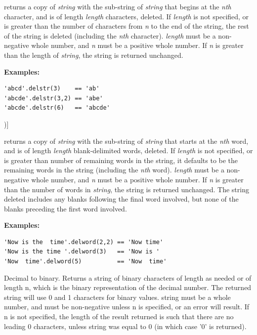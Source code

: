\begin{description}
returns a copy of \emph{string} with the sub-string of
\emph{string} that begins at the \emph{n}\emph{th} character, and is
of length \emph{length} characters, deleted.
If \emph{length} is not specified, or is greater than the number of
characters from \emph{n} to the end of the string, the rest of the
string is deleted (including the \emph{n}\emph{th} character).
\emph{length} must be a non-negative whole number, and \emph{n}
must be a positive whole number.  If \emph{n} is greater than the
length of \emph{string}, the string is returned unchanged.
 
\textbf{Examples:}
\begin{lstlisting}
'abcd'.delstr(3)    == 'ab'
'abcde'.delstr(3,2) == 'abe'
'abcde'.delstr(6)   == 'abcde'
\end{lstlisting}
\item[delword(n [,length])]\label{refdelword}

returns a copy of \emph{string} with the sub-string of
\emph{string} that starts at the \emph{n}\emph{th} word, and is of
length \emph{length} blank-delimited words, deleted.
If \emph{length} is not specified, or is greater than number of
remaining words in the string, it defaults to be the remaining words
in the string (including the \emph{n}\emph{th} word).
\emph{length} must be a non-negative whole number, and \emph{n}
must be a positive whole number.  If \emph{n} is greater than the
number of words in \emph{string}, the string is returned unchanged.
The string deleted includes any blanks following the final word
involved, but none of the blanks preceding the first word involved.
 
\textbf{Examples:}
\begin{lstlisting}
'Now is the  time'.delword(2,2) == 'Now time'
'Now is the time '.delword(3)   == 'Now is '
'Now  time'.delword(5)          == 'Now  time'
\end{lstlisting}

\item[d2b([n{]})]\label{refd2b}
Decimal to binary.
Returns a string of binary characters of length as needed or of length
n, which is the binary representation of the decimal number. The
returned string will use 0 and 1 characters for binary values. string
must be a whole number, and must be non-negative unless n is
specified, or an error will result. If n is not specified, the length
of the result returned is such that there are no leading 0 characters,
unless string was equal to 0 (in which case '0' is returned).


\end{description}
